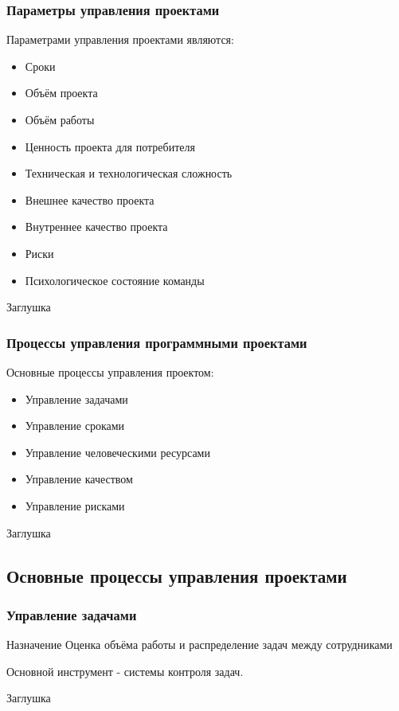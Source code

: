 \documentclass{../industrial-development}
\begin{document}
    \begin{frame} \frametitle{Параметры управления проектами}
        Параметрами управления проектами являются:
        \begin{itemize}
            \item Сроки
            \item Объём проекта
            \item Объём работы
            \item Ценность проекта для потребителя
            \item Техническая и технологическая сложность
            \item Внешнее качество проекта
            \item Внутреннее качество проекта
            \item Риски
            \item Психологическое состояние команды
        \end{itemize}
    \end{frame}
    \lecturenotes
    Заглушка

    \begin{frame} \frametitle{Процессы управления программными проектами}
        Основные процессы управления проектом:
        \begin{itemize}
            \item Управление задачами
            \item Управление сроками
            \item Управление человеческими ресурсами
            \item Управление качеством
            \item Управление рисками
        \end{itemize}
    \end{frame}
    \lecturenotes
    Заглушка

    \subsection{Основные процессы управления проектами}

    \begin{frame} \frametitle{Управление задачами}
        \begin{block}{Назначение}
            Оценка объёма работы и распределение задач между сотрудниками
        \end{block}
        Основной инструмент - системы контроля задач.
    \end{frame}
    \lecturenotes
    Заглушка
\end{document}
